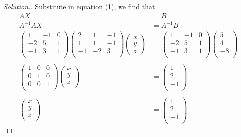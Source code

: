 \documentclass[11pt,a4paper]{article}
\theoremstyle{definition}
\newenvironment{solution}
  {\renewcommand{\qedsymbol}{}\begin{proof}[\textit{Solution}.]}
  {\end{proof}}
\begin{document}
\begin{enumerate}
\begin{solution}
Substitute in equation (1), we find that 
\begin{align*}
AX & =B\\
A^{-1}AX & =A^{-1}B\\
\begin{pmatrix}
1 & -1 & 0\\
-2 & 5 & 1\\
-1 & 3 & 1\\
\end{pmatrix}
\begin{pmatrix}
2 & 1 & -1\\
1 & 1 & -1\\
-1 & -2 & 3\\
\end{pmatrix}
\begin{pmatrix}
x\\y\\z
\end{pmatrix}
& =
\begin{pmatrix}
1 & -1 & 0\\
-2 & 5 & 1\\
-1 & 3 & 1\\
\end{pmatrix}
\begin{pmatrix}
5\\4\\-8\\
\end{pmatrix}\\\\
\begin{pmatrix}
1 & 0 & 0\\
0 & 1 & 0\\
0 & 0 & 1\\
\end{pmatrix}
\begin{pmatrix}
x\\y\\z\\
\end{pmatrix}
&=
\begin{pmatrix}
1\\ 2\\ -1\\
\end{pmatrix}\\\\
\begin{pmatrix}
x\\y\\z\\
\end{pmatrix}
&=
\begin{pmatrix}
1\\2\\-1\\
\end{pmatrix}
\end{align*}


\end{solution}
\end{enumerate}
\end{document}
